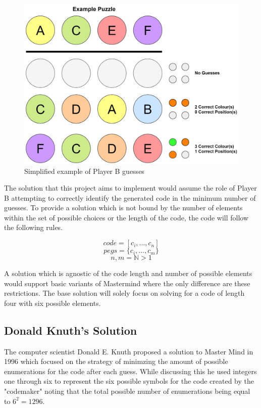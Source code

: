 \documentclass[12pt]{article}  %
\theoremstyle{definition}
\theoremstyle{remark}
\begin{document}
\begin{figure}[H]
\centering
\includegraphics[scale=0.75]{guesses}
\caption{ Simplified example of Player B guesses}
\end{figure}

\par The solution that this project aims to implement would assume the role of Player B attempting to correctly identify the generated code in the minimum number of guesses.
To provide a solution which is not bound by the number of elements within the set of possible choices or the length of the code, the code will follow the following rules.

\[ code = [c_i, ... ,c_n]\]
\[pegs = \{c_i, ... , c_m\}\]
\[ n,m = \mathbb{N} > 1\]

A solution which is agnostic of the code length and number of possible elements would support basic variants of Mastermind where the only difference are these restrictions. The base solution will solely focus on solving for a code of length four with six possible elements.

\subsection {Donald Knuth's Solution}

The computer scientist Donald E. Knuth proposed a solution to Master Mind in 1996 which focused on the strategy of minimzing the amount of possible enumerations for the code after each guess. While discussing this he used integers one through six to represent the six possible symbols for the code created by the "codemaker" noting that the total possible number of enumerations being equal to $6^2 = 1296$. 
\end{document}
